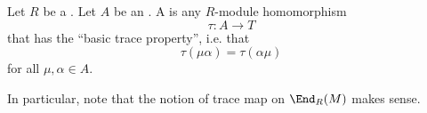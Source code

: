 \begin{definition} \label{definition:trace_map_on_an_algebra_over_a_ring}
Let $R$ be a . Let $A$ be an .
A  is any $R$-module homomorphism 
$$\tau: A \to T$$
that has the ``basic trace property'', i.e. that 
$$\tau(\mu \alpha) = \tau(\alpha \mu)$$
for all $\mu, \alpha\in A$.

In particular, note that the notion of trace map on $\End_R(M)$ makes sense.
\end{definition}